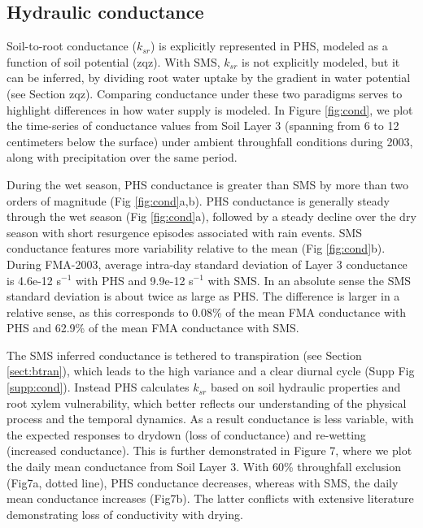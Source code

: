 \documentclass[draft,linenumbers]{agujournal}
\begin{document}
\subsection{Hydraulic conductance}

\label{sect:cond}

Soil-to-root conductance ($k_{sr}$) is explicitly represented in PHS, modeled as a function of soil potential (zqz).
With SMS, $k_{sr}$ is not explicitly modeled, but it can be inferred, by dividing root water uptake by the gradient in water potential (see Section zqz).
Comparing conductance under these two paradigms serves to highlight differences in how water supply is modeled.
In Figure \ref{fig:cond}, we plot the time-series of conductance values from Soil Layer 3 (spanning from 6 to 12 centimeters below the surface) under ambient throughfall conditions during 2003, along with precipitation over the same period.

During the wet season, PHS conductance is greater than SMS by more than two orders of magnitude (Fig \ref{fig:cond}a,b).
PHS conductance is generally steady through the wet season (Fig \ref{fig:cond}a), followed by 
a steady decline over the dry season with short resurgence episodes associated with rain events.
SMS conductance features more variability relative to the mean (Fig \ref{fig:cond}b).
During FMA-2003, average intra-day standard deviation of Layer 3 conductance is 4.6e-12 s$^{-1}$ with PHS and 9.9e-12 s$^{-1}$ with SMS. 
In an absolute sense the SMS standard deviation is about twice as large as PHS.
The difference is larger in a relative sense, as this corresponds to 0.08\% of the mean FMA conductance with PHS
and 62.9\% of the mean FMA conductance with SMS.

The SMS inferred conductance is tethered to transpiration (see Section \ref{sect:btran}), 
which leads to the high variance and a clear diurnal cycle (Supp Fig \ref{supp:cond}). 
Instead PHS calculates $k_{sr}$ based on soil hydraulic properties and root xylem vulnerability, 
which better reflects our understanding of the physical process and the temporal dynamics.
As a result conductance is less variable, with the expected responses to drydown (loss of conductance) and re-wetting (increased conductance).
This is further demonstrated in Figure 7, where we plot the daily mean conductance from Soil Layer 3.
With 60\% throughfall exclusion (Fig7a, dotted line), PHS conductance decreases, whereas with SMS, the daily mean conductance increases (Fig7b).
The latter conflicts with extensive literature demonstrating loss of conductivity with drying.
\end{document}
